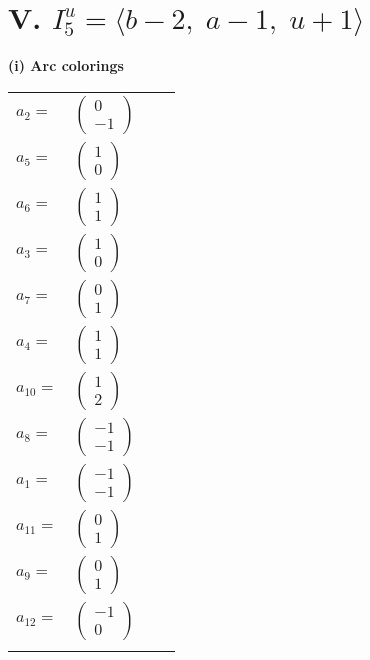 \documentclass[1p]{elsarticle_modified}
\theoremstyle{definition}
\begin{document}
\centering \section*{V. $I^u_{5}= \langle b-2,\;a-1,\;u+1 \rangle$}
\flushleft \textbf{(i) Arc colorings}\\
\begin{tabular}{m{7pt} m{180pt} m{7pt} m{180pt} }
\flushright $a_{2}=$&$\begin{pmatrix}0\\-1\end{pmatrix}$ \\
\flushright $a_{5}=$&$\begin{pmatrix}1\\0\end{pmatrix}$ \\
\flushright $a_{6}=$&$\begin{pmatrix}1\\1\end{pmatrix}$ \\
\flushright $a_{3}=$&$\begin{pmatrix}1\\0\end{pmatrix}$ \\
\flushright $a_{7}=$&$\begin{pmatrix}0\\1\end{pmatrix}$ \\
\flushright $a_{4}=$&$\begin{pmatrix}1\\1\end{pmatrix}$ \\
\flushright $a_{10}=$&$\begin{pmatrix}1\\2\end{pmatrix}$ \\
\flushright $a_{8}=$&$\begin{pmatrix}-1\\-1\end{pmatrix}$ \\
\flushright $a_{1}=$&$\begin{pmatrix}-1\\-1\end{pmatrix}$ \\
\flushright $a_{11}=$&$\begin{pmatrix}0\\1\end{pmatrix}$ \\
\flushright $a_{9}=$&$\begin{pmatrix}0\\1\end{pmatrix}$ \\
\flushright $a_{12}=$&$\begin{pmatrix}-1\\0\end{pmatrix}$\\&\end{tabular}
\end{document}
